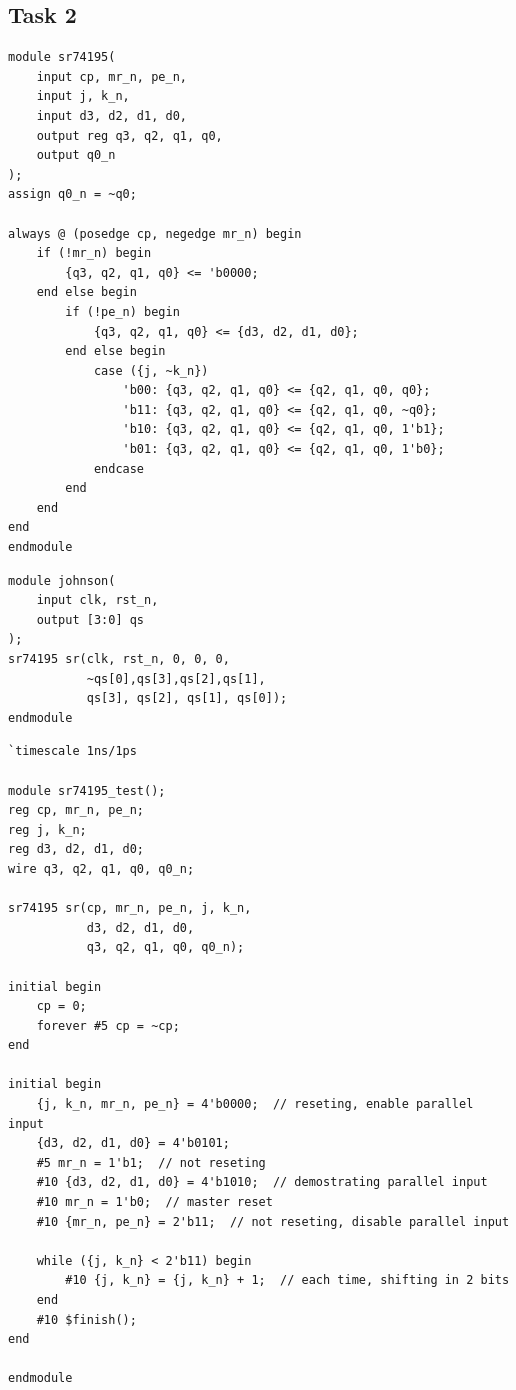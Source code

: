 \documentclass[onecolumn, oneside, ctexart]{SUSTechHomework}
\begin{document}
\subsection{Task 2}
\begin{lstlisting}[caption={Shifting Register 74195 (Design File)}]
module sr74195(
    input cp, mr_n, pe_n,
    input j, k_n,
    input d3, d2, d1, d0,
    output reg q3, q2, q1, q0,
    output q0_n
);
assign q0_n = ~q0;

always @ (posedge cp, negedge mr_n) begin
    if (!mr_n) begin
        {q3, q2, q1, q0} <= 'b0000;
    end else begin
        if (!pe_n) begin
            {q3, q2, q1, q0} <= {d3, d2, d1, d0};
        end else begin
            case ({j, ~k_n})
                'b00: {q3, q2, q1, q0} <= {q2, q1, q0, q0};
                'b11: {q3, q2, q1, q0} <= {q2, q1, q0, ~q0};
                'b10: {q3, q2, q1, q0} <= {q2, q1, q0, 1'b1};
                'b01: {q3, q2, q1, q0} <= {q2, q1, q0, 1'b0};
            endcase
        end
    end
end
endmodule
\end{lstlisting}

\begin{lstlisting}[caption={Johnson Counter (Design File)}]
module johnson(
    input clk, rst_n,
    output [3:0] qs
);
sr74195 sr(clk, rst_n, 0, 0, 0,
           ~qs[0],qs[3],qs[2],qs[1],
           qs[3], qs[2], qs[1], qs[0]);
endmodule
\end{lstlisting}



\begin{lstlisting}[caption={Shifting Register 74195 (Testbench)}]
`timescale 1ns/1ps

module sr74195_test();
reg cp, mr_n, pe_n;
reg j, k_n;
reg d3, d2, d1, d0;
wire q3, q2, q1, q0, q0_n;

sr74195 sr(cp, mr_n, pe_n, j, k_n,
           d3, d2, d1, d0,
           q3, q2, q1, q0, q0_n);

initial begin
    cp = 0;
    forever #5 cp = ~cp;
end

initial begin
    {j, k_n, mr_n, pe_n} = 4'b0000;  // reseting, enable parallel input
    {d3, d2, d1, d0} = 4'b0101;
    #5 mr_n = 1'b1;  // not reseting
    #10 {d3, d2, d1, d0} = 4'b1010;  // demostrating parallel input
    #10 mr_n = 1'b0;  // master reset
    #10 {mr_n, pe_n} = 2'b11;  // not reseting, disable parallel input

    while ({j, k_n} < 2'b11) begin
        #10 {j, k_n} = {j, k_n} + 1;  // each time, shifting in 2 bits
    end
    #10 $finish();
end

endmodule
\end{lstlisting}
\end{document}

